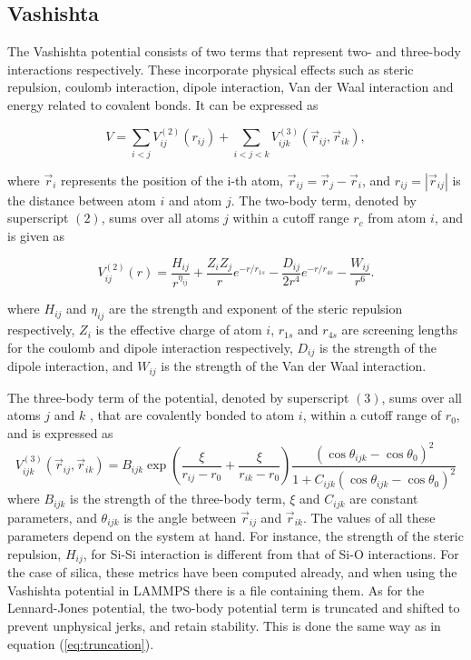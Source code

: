 \documentclass[twoside,english]{uiofysmaster}
\newcommand\lr[1]{\left(#1\right)}
\begin{document}
\subsection{Vashishta}
The Vashishta potential consists of two terms that represent two- and three-body interactions respectively. These incorporate physical effects such as steric repulsion, coulomb interaction, dipole interaction, Van der Waal interaction and energy related to covalent bonds. It can be expressed as

\begin{equation}
V = \sum_{i<j} V_{ij}^{(2)}(r_{ij}) + \sum_{i<j<k} V_{ijk}^{(3)}(\vec{r}_{ij}, \vec{r}_{ik}) , \label{vashistaTwoTerm}
\end{equation}

\noindent
where $\vec{r}_i$ represents the position of the i-th atom, $\vec{r}_{ij} = \vec{r}_j - \vec{r}_i$, and $r_{ij} = |\vec{r}_{ij}|$ is the distance between atom $i$ and atom $j$.
The two-body term, denoted by superscript $(2)$, sums over all atoms $j$ within a cutoff range $r_c$ from atom $i$, and is given as

\begin{equation}
	 V_{ij}^{(2)}(r) = 
	 \frac{H_{ij}}{\displaystyle r^{\eta_{ij}}} +
	 \frac{Z_iZ_j}{r}e^{-r/r_{1s}} -
	 \frac{D_{ij}}{2r^4}e^{-r/r_{4s}} - 
	 \frac{W_{ij}}{r^6}.
\end{equation}

\noindent 
where $H_{ij}$ and $\eta_{ij}$ are the strength and exponent of the steric repulsion respectively, $Z_i$ is the effective charge of atom $i$, $r_{1s}$ and $r_{4s}$ are screening lengths for the coulomb and dipole interaction respectively, $D_{ij}$ is the strength of the dipole interaction, and $W_{ij}$ is the strength of the Van der Waal interaction.

The three-body term of the potential, denoted by superscript $(3)$, sums over all atoms $j$ and $k$ , that are covalently bonded to atom $i$, within a cutoff range of $r_0$, and is expressed as
\begin{equation}
	V_{ijk}^{(3)}(\vec{r}_{ij}, \vec{r}_{ik}) = 
	B_{ijk} \exp\lr{\frac{\xi}{r_{ij}-r_0} + \frac{\xi}{r_{ik}-r_0}}
	\frac{\lr{\cos \theta_{ijk} - \cos \theta_0}^2}{1 + C_{ijk}\lr{\cos \theta_{ijk} - \cos \theta_0}^2}
\end{equation}  
where $B_{ijk}$ is the strength of the three-body term, $\xi$ and $C_{ijk}$ are constant parameters, and $\theta_{ijk}$ is the angle between $\vec{r}_{ij}$ and $\vec{r}_{ik}$.
The values of all these parameters depend on the system at hand. 
For instance, the strength of the steric repulsion, $H_{ij}$, for Si-Si interaction is different from that of Si-O interactions. 
For the case of silica, these metrics have been computed already, and when using the Vashishta potential in LAMMPS there is a file containing them.
As for the Lennard-Jones potential, the two-body potential term is truncated and shifted to prevent unphysical jerks, and retain stability. 
This is done the same way as in equation (\ref{eq:truncation}).
\end{document}
